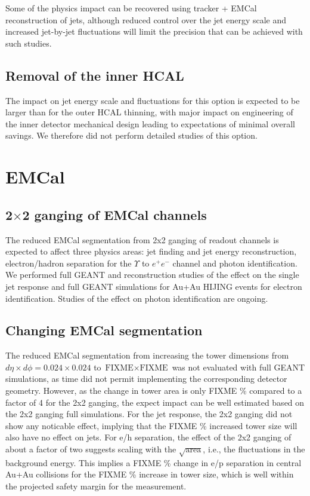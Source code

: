 Some of the physics impact can be recovered using tracker + EMCal reconstruction of jets, although reduced control over the jet 
energy scale and increased jet-by-jet fluctuations will limit the precision that can be achieved with such studies.

\subsection{Removal of the inner HCAL}

The impact on jet energy scale and fluctuations for this option is expected to be larger than for the outer HCAL thinning, 
with major impact on engineering of the inner detector mechanical design leading to expectations of minimal overall savings.
We therefore did not perform detailed studies of this option.

\section{EMCal}
\subsection{2$\times$2 ganging of EMCal channels}
The reduced EMCal segmentation from 2x2 ganging of readout channels is expected to affect three physics areas: jet finding 
and jet energy reconstruction, electron/hadron separation for the $\Upsilon$ to $e^+ e^-$ channel and photon identification.
We performed full GEANT and reconstruction studies of the effect on the single jet response and full GEANT simulations for 
Au+Au HIJING events for electron identification. Studies of the effect on photon identification are ongoing.

\subsection{Changing EMCal segmentation}
The reduced EMCal segmentation from increasing the tower dimensions from $d\eta \times d\phi = 0.024 \times 0.024$ to 
$\mbox{FIXME} \times \mbox{FIXME}$ was not evaluated with full GEANT simulations, as time did not permit implementing
the corresponding detector geometry. However, as the change in tower area is only FIXME \% compared to a factor of 4 for 
the 2x2 ganging, the expect impact can be well estimated based on the 2x2 ganging full simulations. For the 
jet response, the 2x2 ganging did not show any noticable effect, implying that the FIXME \% increased tower size 
will also have no effect on jets. For e/h separation, the effect of the 2x2 ganging of about a factor of two suggests 
scaling with the $\sqrt{\mbox{area}}$, i.e., the fluctuations in the background energy. This implies a FIXME \% change
in e/p separation in central Au+Au collisions for the FIXME \% increase in tower size, which is well within the projected safety margin for the 
measurement.

